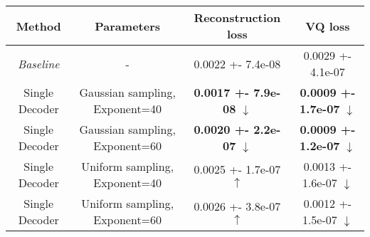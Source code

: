 \centering
\scriptsize
\begin{tabular}{||c|c|c|c||}
\hline
 Method & Parameters & Reconstruction loss & VQ loss \\
\hline
\textit{Baseline} & - & 0.0022 +- 7.4e-08 & 0.0029 +- 4.1e-07 \\
\hline
Single Decoder & Gaussian sampling, Exponent=40 & \textbf{0.0017 +- 7.9e-08}  $\downarrow$ & \textbf{0.0009 +- 1.7e-07}  $\downarrow$ \\
\hline
Single Decoder & Gaussian sampling, Exponent=60 & \textbf{0.0020 +- 2.2e-07}  $\downarrow$ & \textbf{0.0009 +- 1.2e-07}  $\downarrow$ \\
\hline
Single Decoder & Uniform sampling, Exponent=40 & 0.0025 +- 1.7e-07  $\uparrow$ & 0.0013 +- 1.6e-07  $\downarrow$ \\
\hline
Single Decoder & Uniform sampling, Exponent=60 & 0.0026 +- 3.8e-07  $\uparrow$ & 0.0012 +- 1.5e-07  $\downarrow$ \\
\hline
\end{tabular}

